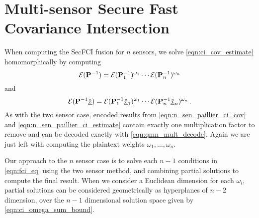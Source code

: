 \documentclass[letterpaper, 10 pt, conference]{ieeeconf}  %
\begin{document}
\section{Multi-sensor Secure Fast Covariance Intersection} \label{sec:multi_secfci}
When computing the SecFCI fusion for $n$ sensors, we solve \eqref{eqn:ci_cov_estimate} homomorphically by computing
\begin{equation}
   \mathcal{E}({{\mathbf{P}}}^{-1}) = \mathcal{E}({{\mathbf{P}}}^{-1}_1)^{\omega_1}\cdots\mathcal{E}({{\mathbf{P}}}^{-1}_n)^{\omega_n} \label{eqn:n_sen_paillier_ci_cov}
\end{equation}
and
\begin{equation}
   \mathcal{E}({{\mathbf{P}}}^{-1}\hat{{\underline{x}}}) = \mathcal{E}({{\mathbf{P}}}^{-1}_1\hat{{\underline{x}}}_1)^{\omega_1}\cdots\mathcal{E}({{\mathbf{P}}}^{-1}_n\hat{{\underline{x}}}_n)^{\omega_n}\,. \label{eqn:n_sen_paillier_ci_estimate}
\end{equation}
As with the two sensor case, encoded results from \eqref{eqn:n_sen_paillier_ci_cov} and \eqref{eqn:n_sen_paillier_ci_estimate} contain exactly one multiplication factor to remove and can be decoded exactly with \eqref{eqn:qmn_mult_decode}. Again we are just left with computing the plaintext weights $\omega_1,\dots,\omega_n$.

Our approach to the $n$ sensor case is to solve each $n-1$ conditions in \eqref{eqn:fci_eq} using the two sensor method, and combining partial solutions to compute the final result. When we consider a Euclidean dimension for each $\omega_i$, partial solutions can be considered geometrically as hyperplanes of $n-2$ dimension, over the $n-1$ dimensional solution space given by \eqref{eqn:ci_omega_sum_bound}. 
\end{document}
